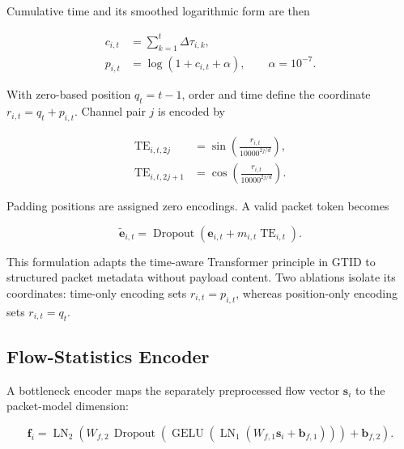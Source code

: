 \documentclass[11pt,fleqn]{report}
\begin{document}
Cumulative time and its smoothed logarithmic form are then

\begin{align}
    c_{i,t} &= \sum_{k=1}^{t}\widehat{\Delta\tau}_{i,k},\\
    p_{i,t} &= \log\left(1+c_{i,t}+\alpha\right),
    \qquad \alpha=10^{-7}.
    \label{eq:cumulative_time_feature}
\end{align}

With zero-based position $q_t=t-1$, order and time define the coordinate $r_{i,t}=q_t+p_{i,t}$. Channel pair $j$ is encoded by

\begin{align}
    \operatorname{TE}_{i,t,2j}
    &=\sin\left(
        \frac{r_{i,t}}{10000^{2j/d}}
      \right),\\
    \operatorname{TE}_{i,t,2j+1}
    &=\cos\left(
        \frac{r_{i,t}}{10000^{2j/d}}
      \right).
    \label{eq:time_aware_sinusoid}
\end{align}

Padding positions are assigned zero encodings. A valid packet token becomes

\begin{equation}
    \widetilde{\mathbf{e}}_{i,t}
    =\operatorname{Dropout}
    \left(
        \mathbf{e}_{i,t}+m_{i,t}\operatorname{TE}_{i,t}
    \right).
    \label{eq:time_encoded_packet}
\end{equation}

This formulation adapts the time-aware Transformer principle in GTID \cite{Han2023GTID} to structured packet metadata without payload content. Two ablations isolate its coordinates: time-only encoding sets $r_{i,t}=p_{i,t}$, whereas position-only encoding sets $r_{i,t}=q_t$.

\subsection{Flow-Statistics Encoder}
\label{subsubsec:flow_encoder}

A bottleneck encoder maps the separately preprocessed flow vector $\mathbf{s}_i$ to the packet-model dimension:

\begin{equation}
    \mathbf{f}_i
    =\operatorname{LN}_2
    \left(
        W_{f,2}\,
        \operatorname{Dropout}
        \left(
            \operatorname{GELU}
            \left(
                \operatorname{LN}_1(W_{f,1}\mathbf{s}_i+\mathbf{b}_{f,1})
            \right)
        \right)
        +\mathbf{b}_{f,2}
    \right).
    \label{eq:flow_feature_encoder}
\end{equation}
\end{document}
